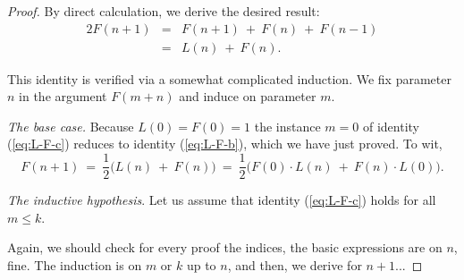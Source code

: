 \begin{proof}
\noindent {}
\bigskip

By direct calculation, we derive the desired result:
\begin{eqnarray*}
2 F(n+1) & = & F(n+1) \ + \ F(n) \ + \ F(n-1) \\
         & = & L(n) \ + \ F(n).
\end{eqnarray*}

\bigskip

This identity is verified via a somewhat complicated induction.  We
fix parameter $n$ in the argument $F(m+n)$ and induce on parameter $m$.

\medskip

\noindent
{\it The base case.}
Because $L(0) = F(0)= 1$ the instance $m=0$ of identity
(\ref{eq:L-F-c}) reduces to identity (\ref{eq:L-F-b}), which we have
just proved.  To wit,
\[ F(n+1) \ = \ \frac{1}{2} \big( L(n) \ + \ F(n) \big)
\ = \ \frac{1}{2} \big( F(0) \cdot L(n) \ + \ F(n) \cdot L(0) \big).
\]

\medskip 

\noindent
{\it The inductive hypothesis}.
Let us assume that identity (\ref{eq:L-F-c}) holds for all $m \leq k$.

{\Denis Again, we should check for every proof the indices, the basic expressions are on $n$, fine.
The induction is on $m$ or $k$ up to $n$, and then, we derive for $n+1$...}
\medskip


\end{proof}
